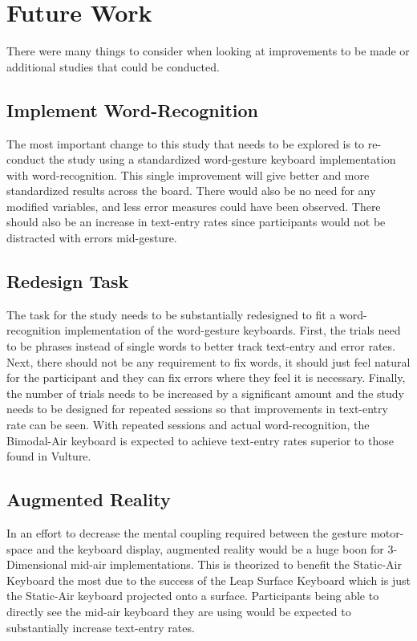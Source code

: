 \section{Future Work}
There were many things to consider when looking at improvements to be made or additional studies that could be conducted.

\subsection{Implement Word-Recognition}
The most important change to this study that needs to be explored is to re-conduct the study using a standardized word-gesture keyboard implementation with word-recognition. This single improvement will give better and more standardized results across the board. There would also be no need for any modified variables, and less error measures could have been observed. There should also be an increase in text-entry rates since participants would not be distracted with errors mid-gesture.

\subsection{Redesign Task}
The task for the study needs to be substantially redesigned to fit a word-recognition implementation of the word-gesture keyboards. First, the trials need to be phrases instead of single words to better track text-entry and error rates. Next, there should not be any requirement to fix words, it should just feel natural for the participant and they can fix errors where they feel it is necessary. Finally, the number of trials needs to be increased by a significant amount and the study needs to be designed for repeated sessions so that improvements in text-entry rate can be seen. With repeated sessions and actual word-recognition, the Bimodal-Air keyboard is expected to achieve text-entry rates superior to those found in Vulture.

\subsection{Augmented Reality}
In an effort to decrease the mental coupling required between the gesture motor-space and the keyboard display, augmented reality would be a huge boon for 3-Dimensional mid-air implementations. This is theorized to benefit the Static-Air Keyboard the most due to the success of the Leap Surface Keyboard which is just the Static-Air keyboard projected onto a surface. Participants being able to directly see the mid-air keyboard they are using would be expected to substantially increase text-entry rates.


